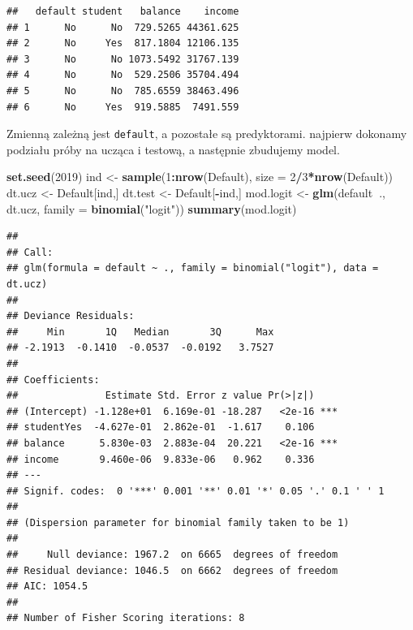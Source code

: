 \documentclass[
]{book}
\newenvironment{Shaded}{\begin{snugshade}}{\end{snugshade}}
\newcommand{\DataTypeTok}[1]{\textcolor[rgb]{0.13,0.29,0.53}{#1}}
\newcommand{\DecValTok}[1]{\textcolor[rgb]{0.00,0.00,0.81}{#1}}
\newcommand{\KeywordTok}[1]{\textcolor[rgb]{0.13,0.29,0.53}{\textbf{#1}}}
\newcommand{\NormalTok}[1]{#1}
\newcommand{\OperatorTok}[1]{\textcolor[rgb]{0.81,0.36,0.00}{\textbf{#1}}}
\newcommand{\StringTok}[1]{\textcolor[rgb]{0.31,0.60,0.02}{#1}}
\theoremstyle{plain}
\theoremstyle{definition}
\theoremstyle{definition}
\theoremstyle{definition}
\theoremstyle{definition}
\theoremstyle{remark}
\begin{document}
\begin{verbatim}
##   default student   balance    income
## 1      No      No  729.5265 44361.625
## 2      No     Yes  817.1804 12106.135
## 3      No      No 1073.5492 31767.139
## 4      No      No  529.2506 35704.494
## 5      No      No  785.6559 38463.496
## 6      No     Yes  919.5885  7491.559
\end{verbatim}

Zmienną zależną jest \texttt{default}, a pozostałe są predyktorami. najpierw dokonamy podziału próby na ucząca i testową, a następnie zbudujemy model.

\begin{Shaded}
\begin{Highlighting}[]
\KeywordTok{set.seed}\NormalTok{(}\DecValTok{2019}\NormalTok{)}
\NormalTok{ind <-}\StringTok{ }\KeywordTok{sample}\NormalTok{(}\DecValTok{1}\OperatorTok{:}\KeywordTok{nrow}\NormalTok{(Default), }\DataTypeTok{size =} \DecValTok{2}\OperatorTok{/}\DecValTok{3}\OperatorTok{*}\KeywordTok{nrow}\NormalTok{(Default))}
\NormalTok{dt.ucz <-}\StringTok{ }\NormalTok{Default[ind,]}
\NormalTok{dt.test <-}\StringTok{ }\NormalTok{Default[}\OperatorTok{-}\NormalTok{ind,]}
\NormalTok{mod.logit <-}\StringTok{ }\KeywordTok{glm}\NormalTok{(default}\OperatorTok{~}\NormalTok{., dt.ucz, }\DataTypeTok{family =} \KeywordTok{binomial}\NormalTok{(}\StringTok{"logit"}\NormalTok{))}
\KeywordTok{summary}\NormalTok{(mod.logit)}
\end{Highlighting}
\end{Shaded}

\begin{verbatim}
## 
## Call:
## glm(formula = default ~ ., family = binomial("logit"), data = dt.ucz)
## 
## Deviance Residuals: 
##     Min       1Q   Median       3Q      Max  
## -2.1913  -0.1410  -0.0537  -0.0192   3.7527  
## 
## Coefficients:
##               Estimate Std. Error z value Pr(>|z|)    
## (Intercept) -1.128e+01  6.169e-01 -18.287   <2e-16 ***
## studentYes  -4.627e-01  2.862e-01  -1.617    0.106    
## balance      5.830e-03  2.883e-04  20.221   <2e-16 ***
## income       9.460e-06  9.833e-06   0.962    0.336    
## ---
## Signif. codes:  0 '***' 0.001 '**' 0.01 '*' 0.05 '.' 0.1 ' ' 1
## 
## (Dispersion parameter for binomial family taken to be 1)
## 
##     Null deviance: 1967.2  on 6665  degrees of freedom
## Residual deviance: 1046.5  on 6662  degrees of freedom
## AIC: 1054.5
## 
## Number of Fisher Scoring iterations: 8
\end{verbatim}
\end{document}
